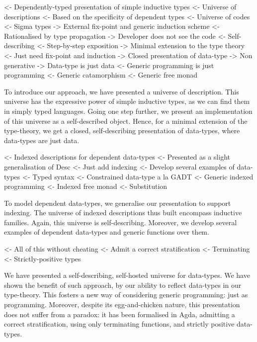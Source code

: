 \documentclass[preprint
              , authoryear
              ]{sigplanconf}
\newenvironment{wstructure}{\comment}{\endcomment}
\begin{document}
\begin{wstructure}
<- Dependently-typed presentation of simple inductive types
    <- Universe of descriptions
        <- Based on the specificity of dependent types
            <- Universe of codes
            <- Sigma types
        -> External fix-point and generic induction scheme
    <- Rationalised by type propagation
        -> Developer does not see the code
    <- Self-describing
        <- Step-by-step exposition
        -> Minimal extension to the type theory
            <- Just need fix-point and induction
        -> Closed presentation of data-type
            -> Non generative
        -> Data-type is just data
    <- Generic programming is just programming
        <- Generic catamorphism
        <- Generic free monad
\end{wstructure}

To introduce our approach, we have presented a universe of
description. This universe has the expressive power of simple
inductive types, as we can find them in simply typed languages. Going
one step further, we present an implementation of this universe as a
self-described object. Hence, for a minimal extension of the
type-theory, we get a closed, self-describing presentation of
data-types, where data-types are just data.

\begin{wstructure}
<- Indexed descriptions for dependent data-types
    <- Presented as a slight generalisation of Desc
        <- Just add indexing
    <- Develop several examples of data-types
        <- Typed syntax
        <- Constrained data-type a la GADT
    <- Generic indexed programming
        <- Indexed free monad
        <- Substitution
\end{wstructure}

To model dependent data-types, we generalise our presentation to
support indexing. The universe of indexed descriptions thus built
encompass inductive families. Again, this universe is
self-describing. Moreover, we develop several examples of dependent
data-types and generic functions over them.

\begin{wstructure}
<- All of this without cheating
    <- Admit a correct stratification
    <- Terminating
    <- Strictly-positive types
\end{wstructure}

We have presented a self-describing, self-hosted universe for
data-types. We have shown the benefit of such approach, by our ability
to reflect data-types in our type-theory. This fosters a new way of
considering generic programming: just as programming. Moreover,
despite its egg-and-chicken nature, this presentation does not suffer
from a paradox: it has been formalised in Agda, admitting a correct
stratification, using only terminating functions, and strictly
positive data-types.
\end{document}
